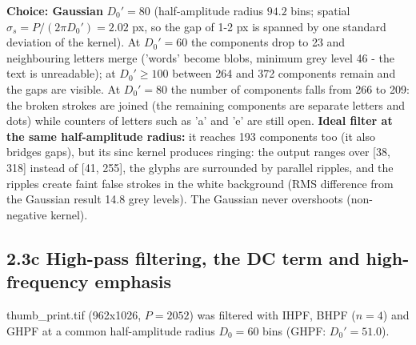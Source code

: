 \documentclass[10pt,a4paper]{article}
\begin{document}
\textbf{Choice: Gaussian }$D_0'=80$ (half-amplitude radius $94.2$ bins; spatial $\sigma_s=P/(2\pi D_0')=2.02$ px, so the gap of 1-2 px is spanned by one standard deviation of the kernel). At $D_0'=60$ the components drop to 23 and neighbouring letters merge ('words' become blobs, minimum grey level 46 - the text is unreadable); at $D_0'\ge100$ between 264 and 372 components remain and the gaps are visible. At $D_0'=80$ the number of components falls from 266 to 209: the broken strokes are joined (the remaining components are separate letters and dots) while counters of letters such as 'a' and 'e' are still open. \textbf{Ideal filter at the same half-amplitude radius:} it reaches 193 components too (it also bridges gaps), but its sinc kernel produces ringing: the output ranges over [38, 318] instead of [41, 255], the glyphs are surrounded by parallel ripples, and the ripples create faint false strokes in the white background (RMS difference from the Gaussian result 14.8 grey levels). The Gaussian never overshoots (non-negative kernel).

\subsection{2.3c High-pass filtering, the DC term and high-frequency emphasis}
thumb\_print.tif (962x1026, $P=2052$) was filtered with IHPF, BHPF ($n=4$) and GHPF at a common half-amplitude radius $D_0=60$ bins (GHPF: $D_0'=51.0$).
\end{document}
